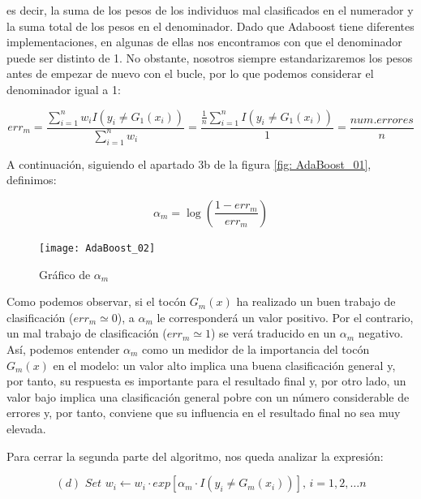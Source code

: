 \documentclass[12pt,twoside]{article}
\begin{document}
\noindent
es decir, la suma de los pesos de los individuos mal clasificados en el numerador y la suma total de los pesos en el denominador. Dado que Adaboost tiene diferentes implementaciones, en algunas de ellas nos encontramos con que el denominador puede ser distinto de 1. No obstante, nosotros siempre estandarizaremos los pesos antes de empezar de nuevo con el bucle, por lo que podemos considerar el denominador igual a 1:

\begin{equation*}
err_m = \frac{\sum_{i=1}^{n} w_i I(y_i \neq G_1(x_i))}{\sum_{i=1}^{n} w_i} = \frac{\frac{1}{n} \sum_{i=1}^{n}I(y_i \neq G_1(x_i))}{1} = \frac{num.errores}{n}
\end{equation*}

A continuación, siguiendo el apartado 3b de la figura \ref{fig: AdaBoost_01}, definimos:

\begin{equation*}
\alpha _m = \log \left( \frac{1 - err_m}{err_m} \right)
\end{equation*}


\begin{figure}[h]
\centering
\texttt{[image: AdaBoost\_02]}
\caption{Gráfico de $\alpha_m$}
\label{fig: AdaBoost_02}
\end{figure}

Como podemos observar, si el tocón $G_m(x)$ ha realizado un buen trabajo de clasificación ($err_m \simeq 0$), a $\alpha_m$ le corresponderá un valor positivo. Por el contrario, un mal trabajo de clasificación ($err_m \simeq 1$) se verá traducido en un $\alpha_m$ negativo. Así, podemos entender $\alpha_m$ como un medidor de la importancia del tocón $G_m(x)$ en el modelo: un valor alto implica una buena clasificación general y, por tanto, su respuesta es importante para el resultado final y, por otro lado, un valor bajo implica una clasificación general pobre con un número considerable de errores y, por tanto, conviene que su influencia en el resultado final no sea muy elevada.

Para cerrar la segunda parte del algoritmo, nos queda analizar la expresión:

\begin{equation*}
(d) \, \, Set \, \, w_i \longleftarrow w_i \cdot exp[\alpha_m \cdot I(y_i \neq G_m(x_i))], \, i = 1, 2, \dots n 
\end{equation*}
\end{document}
